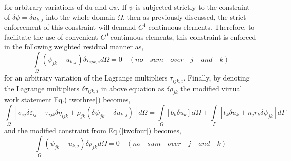 \documentclass[12pt]{article}
\begin{document}
\newline
for arbitrary variations of du and d$\psi$. If $ \psi $ is subjected strictly to the constraint of
$ \delta\psi = \delta u_{k,j} $ into the whole domain $ \Omega $, then as previously discussed, the strict enforcement of this constraint will demand $C^1$ continuous elements. Therefore, to facilitate the use of convenient $C^0$-continuous elements, this constraint is enforced in the following weighted residual manner as,
\begin{equation}\label{twofour}
\int\limits_\Omega\! (\psi_{jk} - u_{k,j})\delta\tau_{ijk,i} d\Omega = 0  \quad (no \quad sum\quad over \quad j \quad and \quad k)
\end{equation}
for an arbitrary variation of the Lagrange multipliers $ \tau_{ijk,i} $. Finally, by denoting the Lagrange multipliers $ \delta \tau_{ijk,i}$ in above equation as $ \delta\rho_{jk} $ the modified virtual work statement Eq.(\ref{twothree}) becomes,
\begin{equation}
\int\limits_\Omega\! [ \sigma_{ij}\delta\varepsilon_{ij} + \tau_{ijk}\delta\eta_{ijk} + \rho_{jk}(\delta\psi_{jk}-\delta u_{k,j})] d\Omega = \int\limits_\Omega\! [b_k\delta u_k] d\Omega + \int\limits_\Gamma\! [ t_k\delta u_k + n_jr_k\delta\psi_{jk} ] d\Gamma
\end{equation}
and the modified constraint from Eq.(\ref{twofour}) becomes,
\begin{equation}
\int\limits_\Omega\! (\psi_{jk} - u_{k,j})\delta\rho_{jk}  d\Omega = 0  \quad (no \quad sum\quad over \quad j \quad and \quad k)
\end{equation} 
\end{document}
